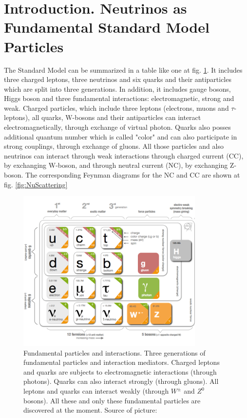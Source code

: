 \section{Introduction. Neutrinos as Fundamental Standard Model Particles}

The Standard Model can be summarized in a table like one at fig. \ref{fig:StandardModel}. It includes three charged leptons, three neutrinos and six quarks and their antiparticles which are split into three generations. In addition, it includes gauge bosons, Higgs boson and three fundamental interactions: electromagnetic, strong and weak. Charged particles, which include three leptons (electrons, muons and $\tau$-leptons), all quarks, W-bosons and their antiparticles can interact electromagnetically, through exchange of virtual photon. Quarks also posses additional quantum number which is called "color" and can also participate in strong couplings, through exchange of gluons. All those particles and also neutrinos can interact through weak interactions through charged current (CC), by exchanging W-boson, and through neutral current (NC), by exchanging Z-boson. The corresponding Feynman diagrams for the NC and CC are shown at fig. \ref{fig:NuScattering}\\

\begin{figure}
\caption{Fundamental particles and interactions. Three generations of fundamental particles and interaction mediators. Charged leptons and quarks are subjects to electromagnetic interactions (through photons). Quarks can also interact strongly (through gluons). All leptons and quarks can interact weakly (through $W^{\pm}$ and $Z^0$ bosons). All these and only these fundamental particles are discovered at the moment. Source of picture: \cite{ref_fig_StandardModel}}
\label{fig:StandardModel}
\centering 
\includegraphics[width=0.83\textwidth, keepaspectratio=true]{figs/StandardModel.png}
\end{figure}


